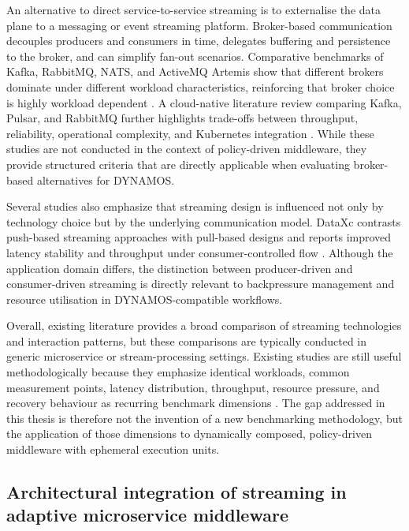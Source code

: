 An alternative to direct service-to-service streaming is to externalise the data plane to a messaging or event streaming platform. Broker-based communication decouples producers and consumers in time, delegates buffering and persistence to the broker, and can simplify fan-out scenarios. Comparative benchmarks of Kafka, RabbitMQ, NATS, and ActiveMQ Artemis show that different brokers dominate under different workload characteristics, reinforcing that broker choice is highly workload dependent \cite{ibrahim2026brokers}. A cloud-native literature review comparing Kafka, Pulsar, and RabbitMQ further highlights trade-offs between throughput, reliability, operational complexity, and Kubernetes integration \cite{nuikka2021cloudnative}. While these studies are not conducted in the context of policy-driven middleware, they provide structured criteria that are directly applicable when evaluating broker-based alternatives for DYNAMOS.

Several studies also emphasize that streaming design is influenced not only by technology choice but by the underlying communication model. DataXc contrasts push-based streaming approaches with pull-based designs and reports improved latency stability and throughput under consumer-controlled flow \cite{coviello2022dataxc}. Although the application domain differs, the distinction between producer-driven and consumer-driven streaming is directly relevant to backpressure management and resource utilisation in DYNAMOS-compatible workflows.

Overall, existing literature provides a broad comparison of streaming technologies and interaction patterns, but these comparisons are typically conducted in generic microservice or stream-processing settings. Existing studies are still useful methodologically because they emphasize identical workloads, common measurement points, latency distribution, throughput, resource pressure, and recovery behaviour as recurring benchmark dimensions \cite{karimov2018benchmarking,Henning2021ScalabilityMetrics,systematicstreaming,ciftci2025ipcmechanisms}. The gap addressed in this thesis is therefore not the invention of a new benchmarking methodology, but the application of those dimensions to dynamically composed, policy-driven middleware with ephemeral execution units.

\subsection{Architectural integration of streaming in adaptive microservice middleware}

